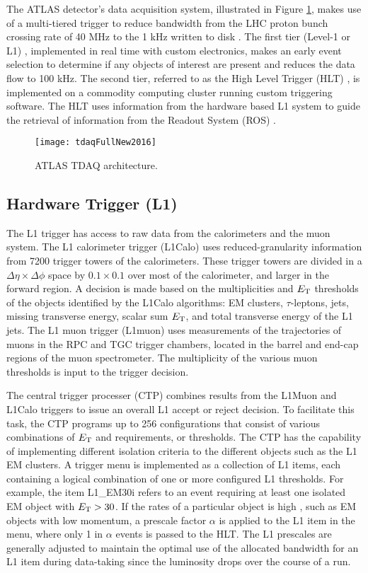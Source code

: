 The ATLAS  detector's data acquisition system, illustrated in Figure \ref{fig:tdaq_diagram}, makes use of a multi-tiered trigger to reduce 
bandwidth from the LHC proton bunch crossing rate of 40 MHz
to the 1 kHz written to disk \cite{evolution1,evolution2}. The first tier (Level-1 or L1) \cite{l1}, implemented in real time with custom electronics, 
makes an early event selection to determine if any objects of interest are present and reduces the data flow to 
100 kHz. The second tier, referred to as the High Level Trigger (HLT) \cite{hlt}, is implemented on a commodity computing cluster running custom triggering software. The HLT uses information from the
hardware based L1 system to guide the retrieval of information from the Readout System (ROS) \cite{ros}. 

\begin{figure}[!t]
\centering
\texttt{[image: tdaqFullNew2016]}
\vspace{-0.5cm}
\caption{ATLAS TDAQ architecture.}
\label{fig:tdaq_diagram}
\end{figure} 

\subsection{Hardware Trigger (L1)}
The L1 trigger has access to raw data from the calorimeters and the 
muon system. The L1 calorimeter trigger (L1Calo) uses reduced-granularity
information from 7200 trigger towers of the calorimeters. These trigger 
towers are divided in a $\Delta\eta\times\Delta\phi$ space by 
$0.1 \times 0.1$ over most of the calorimeter, and larger in the forward 
region. A decision is made based on the multiplicities and $E_{\rm{T}}$ 
thresholds of the objects 
identified by the L1Calo algorithms: EM clusters, 
$\tau$-leptons, jets, missing transverse energy, scalar sum $E_{\rm{T}}$, 
and total transverse energy of the L1 jets.
The L1 muon trigger (L1muon) uses measurements of the trajectories of muons 
in the RPC and TGC trigger chambers, located in the barrel and end-cap regions 
of the muon spectrometer. The multiplicity of the various muon \pt thresholds
is input to the trigger decision.

The central trigger processer (CTP) combines results from the L1Muon and L1Calo
triggers to issue an overall L1 accept or reject decision.
To facilitate this task, the CTP programs up to 256 configurations that 
consist of various combinations of $E_{\rm{T}}$ and \pt requirements, 
or thresholds.
The CTP has the capability of implementing different isolation criteria 
to the different objects such as the L1 EM clusters. 
A trigger menu is implemented as a collection of L1 items, each containing a 
logical combination of one or more configured L1 thresholds. 
For example, the item L1\_EM30i refers to an event requiring at least one 
isolated EM object with $E_{\rm{T}} > 30 $\GeV. If the rates of a particular 
object is high , such as EM objects with low momentum, a prescale factor $\alpha$ is applied to the L1 item in the menu, where only 1 in $\alpha$
events is passed to the HLT. The L1 prescales are generally adjusted to 
maintain the optimal use of the allocated bandwidth for an L1 item during 
data-taking since the luminosity drops over the course of a run.

